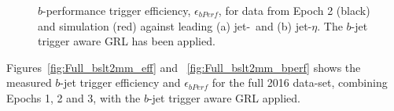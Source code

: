 \begin{figure}[!ht]
  \begin{center}
    \captionsetup[subfigure]{aboveskip=0pt,justification=centering}
  \end{center}
  \caption{$b$-performance trigger efficiency, $\epsilon_{bPerf}$, for data from Epoch 2 (black) and simulation (red) against leading (a) jet-\pT~and (b) jet-$\eta$.
    The $b$-jet trigger aware GRL has been applied.}
  \label{fig:Epoch2_bslt2mm_bperf}
\end{figure}

Figures~\ref{fig:Full_bslt2mm_eff} and ~\ref{fig:Full_bslt2mm_bperf} shows the measured
$b$-jet trigger efficiency and $\epsilon_{bPerf}$
for the full 2016 data-set, combining Epochs 1, 2 and 3,
with the $b$-jet trigger aware GRL applied.


